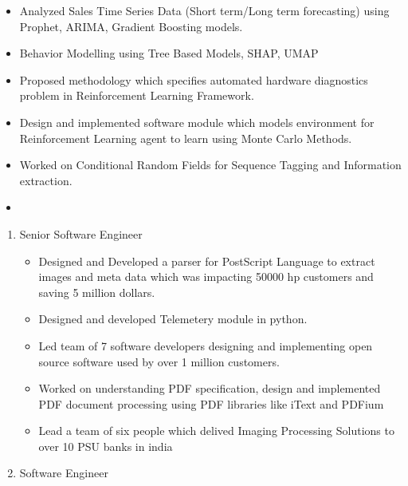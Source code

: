 \documentclass[10pt,a4paper,ragged2e,withhyper]{altacv}
\begin{document}
\begin{paracol}{2}
\par\divider
{}

\begin{itemize}
\item Analyzed Sales Time Series Data (Short term/Long term forecasting) using
Prophet, ARIMA, Gradient Boosting models.
\item Behavior Modelling using Tree Based Models, SHAP, UMAP
\item Proposed methodology which specifies automated hardware diagnostics problem
in Reinforcement Learning Framework.
\item Design and implemented software module which models environment for
Reinforcement Learning agent to learn using Monte Carlo Methods.
\item Worked on Conditional Random Fields for Sequence Tagging and Information
extraction.
\item 
\end{itemize}

\begin{enumerate}
\item Senior Software Engineer
\label{sec:org5019653}
\par\divider
{}
\begin{itemize}
\item Designed and Developed a parser for PostScript Language to extract images and
meta data which was impacting 50000 hp customers and saving 5 million dollars.
\item Designed and developed Telemetery module in python.
\item Led team of 7 software developers designing and implementing open source
software used by over 1 million customers.
\item Worked on understanding PDF specification, design and implemented PDF document
processing using PDF libraries like iText and PDFium
\item Lead a team of six people which delived Imaging Processing Solutions to over
10 PSU banks in india
\end{itemize}


\item Software Engineer
\label{sec:org92e244d}
\par\divider
{}
\end{enumerate}


\end{paracol}
\end{document}
